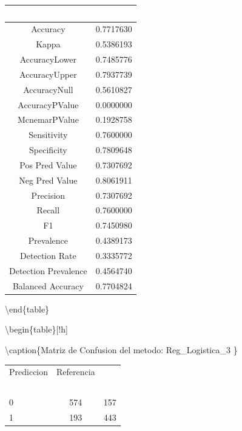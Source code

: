 \documentclass[]{article}
\begin{document}
\begin{tabular}[t]{cc}
\toprule
\rowcolor{black}  \multicolumn{1}{c}{\textcolor{white}{\textbf{metricas}}} & \multicolumn{1}{c}{\textcolor{white}{\textbf{valor}}}\\
\midrule
\rowcolor{gray!6}  Accuracy & 0.7717630\\
Kappa & 0.5386193\\
\rowcolor{gray!6}  AccuracyLower & 0.7485776\\
AccuracyUpper & 0.7937739\\
\rowcolor{gray!6}  AccuracyNull & 0.5610827\\
\addlinespace
AccuracyPValue & 0.0000000\\
\rowcolor{gray!6}  McnemarPValue & 0.1928758\\
Sensitivity & 0.7600000\\
\rowcolor{gray!6}  Specificity & 0.7809648\\
Pos Pred Value & 0.7307692\\
\addlinespace
\rowcolor{gray!6}  Neg Pred Value & 0.8061911\\
Precision & 0.7307692\\
\rowcolor{gray!6}  Recall & 0.7600000\\
F1 & 0.7450980\\
\rowcolor{gray!6}  Prevalence & 0.4389173\\
\addlinespace
Detection Rate & 0.3335772\\
\rowcolor{gray!6}  Detection Prevalence & 0.4564740\\
Balanced Accuracy & 0.7704824\\
\bottomrule
\end{tabular}

\textbackslash{}end\{table\}

\textbackslash{}begin\{table\}{[}!h{]}

\textbackslash{}caption\{\label{tab:MatrizConf_Reg_Logistica_3}Matriz de
Confusion del metodo: Reg\_Logistica\_3 \} \centering

\begin{tabular}[t]{lcc}
\toprule
\multicolumn{1}{c}{Prediccion} & \multicolumn{1}{c}{Referencia} & \multicolumn{1}{c}{ } \\
\cmidrule(l{3pt}r{3pt}){1-1} \cmidrule(l{3pt}r{3pt}){2-2}
\rowcolor{black}  \multicolumn{1}{c}{\textcolor{white}{\textbf{ }}} & \multicolumn{1}{c}{\textcolor{white}{\textbf{0}}} & \multicolumn{1}{c}{\textcolor{white}{\textbf{1}}}\\
\midrule
\rowcolor{gray!6}  0 & 574 & 157\\
1 & 193 & 443\\
\bottomrule
\end{tabular}
\end{document}
